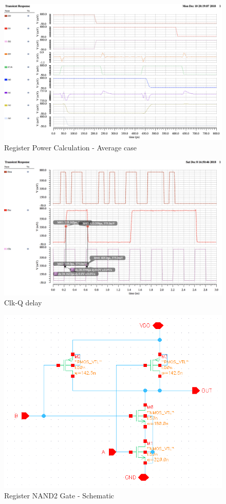 \documentclass[10pt,letterpaper,onecolumn]{article}
\begin{document}
\begin{figure}[h!]
\centering
\includegraphics[clip,width=\columnwidth]{RegisterPower2.png}
\caption{Register Power Calculation - Average case}
\label{fig:RegisterPower2}
\end{figure}

\begin{figure}[h!]
\centering
\includegraphics[clip,width=\columnwidth]{CQDelay.png}
\caption{Clk-Q delay}
\label{fig:CQDelay}
\end{figure}

\begin{figure}[h!]
\centering
\includegraphics[clip,width=0.6\columnwidth]{NAND2.png}
\caption{Register NAND2 Gate - Schematic}
\label{fig:NAND2}
\end{figure}
\end{document}
